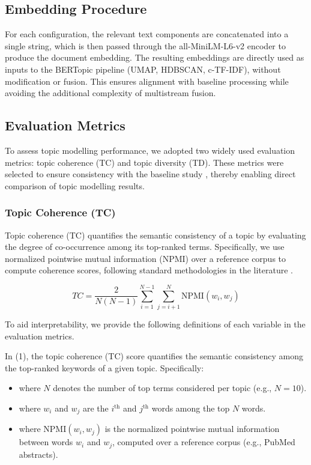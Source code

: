 \documentclass[utf8]{FrontiersinHarvard}
\begin{document}
\subsection{Embedding Procedure}

For each configuration, the relevant text components are concatenated into a single string, which is then passed through the all-MiniLM-L6-v2 encoder to produce the document embedding. The resulting embeddings are directly used as inputs to the BERTopic pipeline (UMAP, HDBSCAN, c-TF-IDF), without modification or fusion. This ensures alignment with baseline processing while avoiding the additional complexity of multistream fusion.

\subsection{Evaluation Metrics}

To assess topic modelling performance, we adopted two widely used evaluation metrics: topic coherence (TC) and topic diversity (TD). These metrics were selected to ensure consistency with the baseline study \citep{lezhnina_depression_2023}, thereby enabling direct comparison of topic modelling results.

\subsubsection{Topic Coherence (TC)}

Topic coherence (TC) quantifies the semantic consistency of a topic by evaluating the degree of co-occurrence among its top-ranked terms. Specifically, we use normalized pointwise mutual information (NPMI) over a reference corpus to compute coherence scores, following standard methodologies in the literature \citep{mimno_optimizing_2011,roder_exploring_2015}.

\begin{equation}
TC = \frac{2}{N(N-1)} \sum_{i=1}^{N-1} \sum_{j=i+1}^{N} \text{NPMI}(w_i, w_j)
\end{equation}

To aid interpretability, we provide the following definitions of each variable in the evaluation metrics.

In (1), the topic coherence (TC) score quantifies the semantic consistency among the top-ranked keywords of a given topic. Specifically:

\begin{itemize}
    \item where $N$ denotes the number of top terms considered per topic (e.g., $N = 10$).

    \item where $w_i$ and $w_j$ are the $i^{\text{th}}$ and $j^{\text{th}}$ words among the top $N$ words.

    \item where NPMI$(w_i, w_j)$ is the normalized pointwise mutual information between words $w_i$ and $w_j$, computed over a reference corpus (e.g., PubMed abstracts).
\end{itemize}
\end{document}
